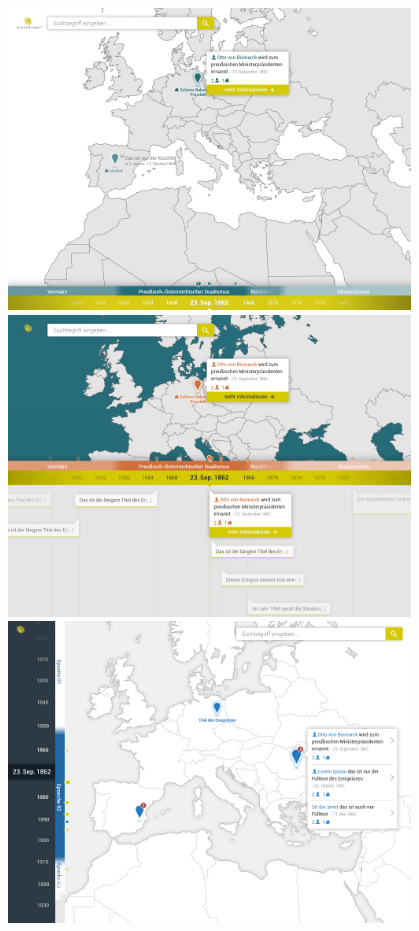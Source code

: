 \begin{figure}[H]
  \centering
  \begin{minipage}{0.32\textwidth}
    \includegraphics[width=0.95\textwidth]{graphics/design-2.jpg}
  \end{minipage}
  \begin{minipage}{0.32\textwidth}
    \includegraphics[width=0.95\textwidth]{graphics/design-3.jpg}
  \end{minipage}
  \begin{minipage}{0.32\textwidth}
    \includegraphics[width=0.95\textwidth]{graphics/design-4.jpg}

\end{minipage}
\end{figure}
